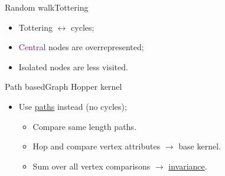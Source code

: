 \documentclass[12pt]{beamer}
\begin{document}
            \begin{frame}{Random walk}{Tottering}
                \begin{figure}[H]
                    \centering
                    
                \end{figure}
                \begin{itemize}
                    \item Tottering \(\longleftrightarrow\) cycles;
                    \item \textcolor{purple}{Central} nodes are overrepresented;
                    \item \textcolor{purple!30}{Isolated} nodes are less visited.
                \end{itemize}
            \end{frame}

            \begin{frame}
                \centering
                
            \end{frame}

            \begin{frame}{Path based}{Graph Hopper kernel}
                \begin{figure}[H]
                    \centering
                    
                \end{figure}

                \begin{itemize}[label=\(\blacktriangleright\), font=\color{IGNGreen}]
                    \item<2-> Use \underline{paths} instead (no cycles);
                    \begin{itemize}[label=\(\blacktriangleright\), font=\color{IGNGreen}]
                        \item<3-> Compare same length paths.
                        \item<7-> Hop and compare vertex attributes \(\longrightarrow\) base kernel.
                        \item<11-> Sum over all vertex comparisons \(\longrightarrow\) \underline{invariance}.
                    \end{itemize}
                \end{itemize}
            \end{frame}
\end{document}
